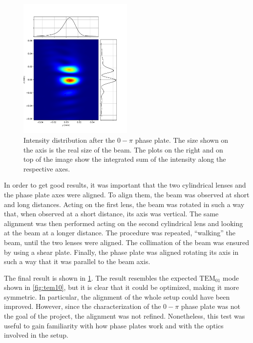 \begin{figure}
    \centering
    \includegraphics[width=0.5\textwidth]{chapters/chapter_3/figures/0pi_image.pdf}
    \caption{Intensity distribution after the $0-\pi$ phase plate. The size shown on the axis is the real size of the beam. The plots on the right and on top of the image show the integrated sum of the intensity along the respective axes.}
    \label{fig:0pi_image}
\end{figure}


In order to get good results, it was important that the two cylindrical lenses and the phase plate axes were aligned. To align them, the beam was observed at short and long distances. Acting on the first lens, the beam was rotated in such a way that, when observed at a short distance, its axis was vertical. The same alignment was then performed acting on the second cylindrical lens and looking at the beam at a longer distance. The procedure was repeated, \enquote{walking} the beam, until the two lenses were aligned. The collimation of the beam was ensured by using a shear plate. Finally, the phase plate was aligned rotating its axis in such a way that it was parallel to the beam axis.

The final result is shown in \cref{fig:0pi_image}. The result resembles the expected $\text{TEM}_{01}$ mode shown in \cref{fig:tem10}, but it is clear that it could be optimized, making it more symmetric. In particular, the alignment of the whole setup could have been improved.  However, since the characterization of the $0-\pi$ phase plate was not the goal of the project, the alignment was not refined. Nonetheless, this test was useful to gain familiarity with how phase plates work and with the optics involved in the setup.

